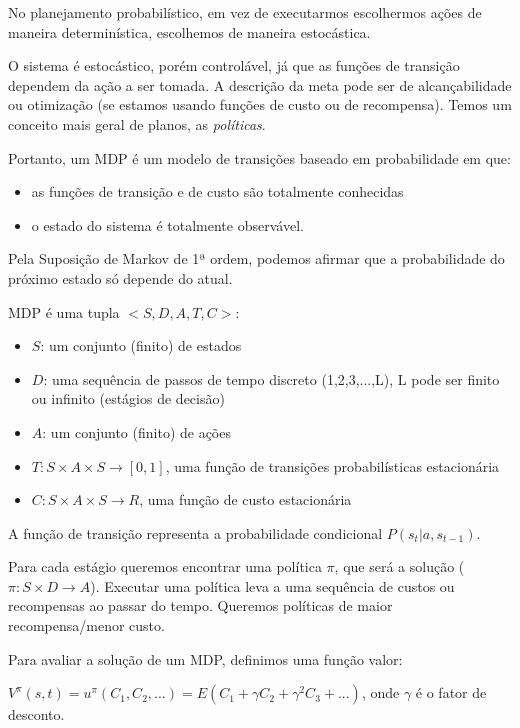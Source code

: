 \documentclass[12pt,letterpaper]{article}
\begin{document}
	No planejamento probabilístico, em vez de executarmos escolhermos ações de maneira determinística, escolhemos de maneira estocástica.
	
	O sistema é estocástico, porém controlável, já que as funções de transição dependem da ação a ser tomada. A descrição da meta pode ser de alcançabilidade ou otimização (se estamos usando funções de custo ou de recompensa). Temos um conceito mais geral de planos, as \textit{políticas}.
	
	Portanto, um MDP é um modelo de transições baseado em probabilidade em que:
	
	\begin{itemize}
		\item as funções de transição e de custo são totalmente conhecidas
		\item o estado do sistema é totalmente observável.
	\end{itemize}
	
	Pela Suposição de Markov de 1ª ordem, podemos afirmar que a probabilidade do próximo estado só depende do atual.
	
	MDP é uma tupla $<S,D,A,T,C>$:
	\begin{itemize}
		\item $S$: um conjunto (finito) de estados
		\item $D$: uma sequência de passos de tempo
		discreto (1,2,3,...,L), L pode ser finito
		ou infinito (estágios de decisão)
		\item $A$: um conjunto (finito) de ações
		\item $T: S \times A \times S \to [0,1]$, uma função de
		transições probabilísticas estacionária
		\item $C: S \times A \times S \to R$, uma função de custo
		estacionária
	\end{itemize}
	
	A função de transição representa a probabilidade condicional $P(s_t|a, s_{t-1})$.
	
	Para cada estágio queremos encontrar uma política $\pi$, que será a solução ($\pi: S \times D \to A$). Executar uma política leva a uma sequência de custos ou recompensas ao passar do tempo. Queremos políticas de maior recompensa/menor custo. 
	
	Para avaliar a solução de um MDP, definimos uma função valor:
	
	\begin{center}
		$V^\pi(s,t) = u^\pi(C_1, C_2, ...) = E(C_1 + \gamma C_2 + \gamma^2C_3+ ...)$, onde $\gamma$ é o fator de desconto.
	\end{center}
	
\end{document}
